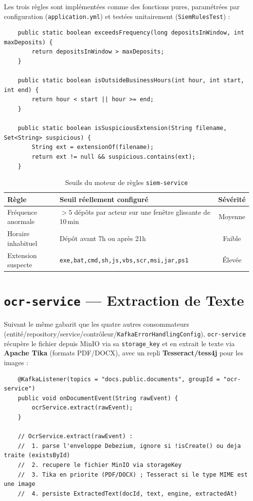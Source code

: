 \documentclass[12pt,a4paper,openany]{report}
\begin{document}
    Les trois r\`egles sont impl\'ement\'ees comme des fonctions pures, param\'etr\'ees par configuration (\texttt{application.yml}) et test\'ees unitairement (\texttt{SiemRulesTest}) :

    \begin{lstlisting}
    public static boolean exceedsFrequency(long depositsInWindow, int maxDeposits) {
        return depositsInWindow > maxDeposits;
    }

    public static boolean isOutsideBusinessHours(int hour, int start, int end) {
        return hour < start || hour >= end;
    }

    public static boolean isSuspiciousExtension(String filename, Set<String> suspicious) {
        String ext = extensionOf(filename);
        return ext != null && suspicious.contains(ext);
    }
    \end{lstlisting}

    \begin{table}[H]
    \centering
    \begin{tabularx}{\textwidth}{lXc}
    \toprule
    \textbf{R\`egle} & \textbf{Seuil r\'eellement configur\'e} & \textbf{S\'ev\'erit\'e} \\
    \midrule
    Fr\'equence anormale & $>5$ d\'ep\^ots par acteur sur une fen\^etre glissante de 10\,min & Moyenne \\
    Horaire inhabituel & D\'ep\^ot avant 7h ou apr\`es 21h & Faible \\
    Extension suspecte & \texttt{exe,bat,cmd,sh,js,vbs,scr,msi,jar,ps1} & \'Elev\'ee \\
    \bottomrule
    \end{tabularx}
    \caption{Seuils du moteur de r\`egles \texttt{siem-service}}
    \end{table}

    \section{\texttt{ocr-service} --- Extraction de Texte}

    Suivant le m\^eme gabarit que les quatre autres consommateurs (entit\'e/repository/service/contr\^oleur/\texttt{KafkaErrorHandlingConfig}), \texttt{ocr-service} r\'ecup\`ere le fichier depuis MinIO via sa \texttt{storage\_key} et en extrait le texte via \textbf{Apache Tika} (formats PDF/DOCX), avec un repli \textbf{Tesseract/tess4j} pour les images :

    \begin{lstlisting}
    @KafkaListener(topics = "docs.public.documents", groupId = "ocr-service")
    public void onDocumentEvent(String rawEvent) {
        ocrService.extract(rawEvent);
    }

    // OcrService.extract(rawEvent) :
    //  1. parse l'enveloppe Debezium, ignore si !isCreate() ou deja traite (existsById)
    //  2. recupere le fichier MinIO via storageKey
    //  3. Tika en priorite (PDF/DOCX) ; Tesseract si le type MIME est une image
    //  4. persiste ExtractedText(docId, text, engine, extractedAt)
    \end{lstlisting}
\end{document}
